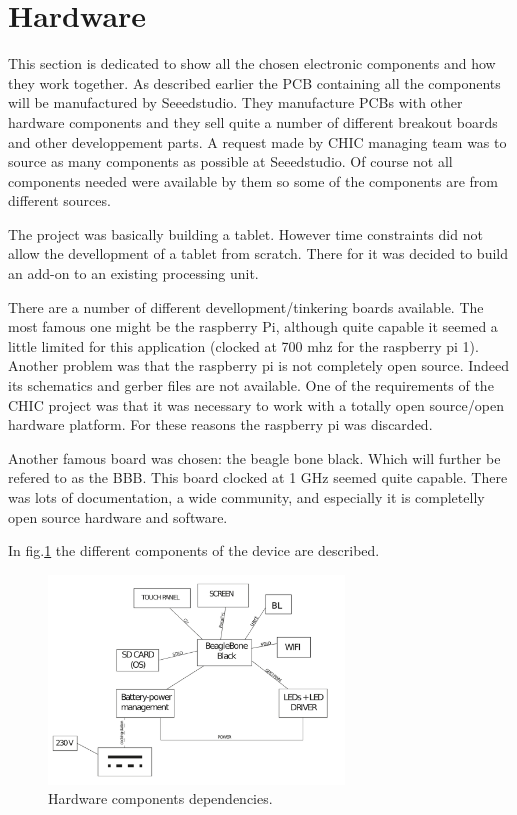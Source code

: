 \section{Hardware}

This section is dedicated to show all the chosen electronic components and how they work together. As described earlier the PCB containing all the components will be manufactured by Seeedstudio. They manufacture PCBs with other hardware components and they sell quite a number of different breakout boards and other developpement parts. A request made by CHIC managing team was to source as many components as possible at Seeedstudio. Of course not all components needed were available by them so some of the components are from different sources.

The project was basically building a tablet. However time constraints did not allow the devellopment of a tablet from scratch. There for it was decided to build an add-on to an existing processing unit.

There are a number of different devellopment/tinkering boards available. The most famous one might be the raspberry Pi, although quite capable it seemed a little limited for this application (clocked at 700 mhz for the raspberry pi 1). Another problem was that the raspberry pi is not completely open source. Indeed its schematics and gerber files are not available. One of the requirements of the CHIC project was that it was necessary to work with a totally open source/open hardware platform. For these reasons the raspberry pi was discarded.

 Another famous board was chosen: the beagle bone black. Which will further be refered to as the BBB. This board clocked at 1 GHz seemed quite capable. There was lots of documentation, a wide community, and especially it is completelly open source hardware and software.

In fig.\ref{fig:hardware dependencies} the different components of the device are described.

\begin{figure}[!htb]
    \centering
    \includegraphics[width=0.7\textwidth,keepaspectratio]{chap/hardFig/overall_hardware_dependecies}
    \caption{Hardware components dependencies.}
    \label{fig:hardware dependencies}
\end{figure}

